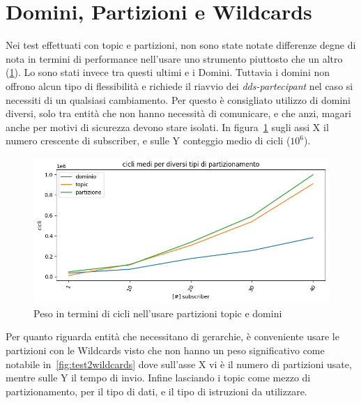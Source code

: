 \section{Domini, Partizioni e Wildcards}
Nei test effettuati con topic e partizioni, non sono state notate differenze degne di nota in termini di performance nell'usare uno strumento piuttosto che un altro (\ref{fig:test2parttopicdomain}). Lo sono stati invece tra questi ultimi e i Domini. Tuttavia i domini non offrono alcun tipo di flessibilità e richiede il riavvio dei \emph{dds-partecipant} nel caso si necessiti di un qualsiasi cambiamento. Per questo è consigliato utilizzo di domini diversi, solo tra entità che non hanno necessità di comunicare, e che anzi, magari anche per motivi di sicurezza devono stare isolati. 
In figura~\ref{fig:test2parttopicdomain} sugli assi X il numero crescente di subscriber, e sulle Y conteggio medio di cicli ($10^6$).

\begin{figure}[H]
    \includegraphics[width=\textwidth]{./results/test2_cicli_partvstopicvsdomaain.png} 
        \caption{Peso in termini di cicli nell'usare partizioni topic e domini}\label{fig:test2parttopicdomain}
\end{figure}

Per quanto riguarda entità che necessitano di gerarchie, è conveniente usare le partizioni con le Wildcards visto che non hanno un peso significativo come notabile in~\ref{fig:test2wildcards} dove sull'asse X vi è il numero di partizioni usate, mentre sulle Y il tempo di invio. Infine lasciando i topic come mezzo di partizionamento, per il tipo di dati, e il tipo di istruzioni da utilizzare.

